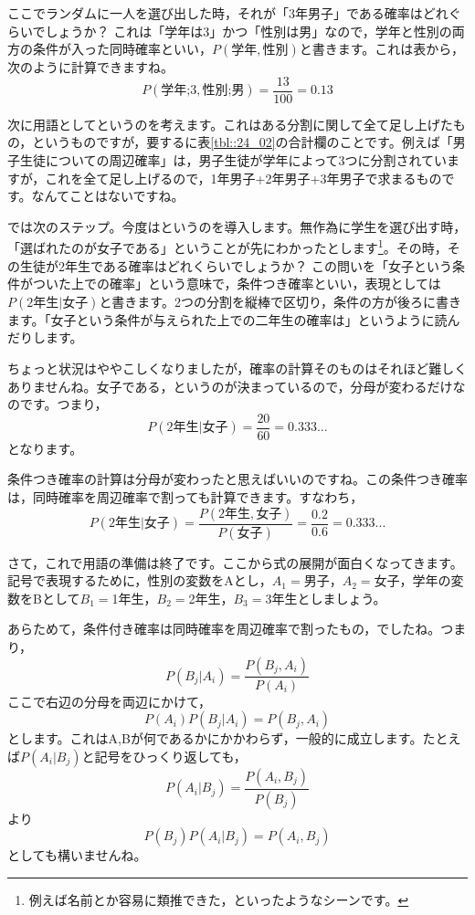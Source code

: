 ここでランダムに一人を選び出した時，それが「3年男子」である確率はどれぐらいでしょうか？ これは「学年は3」かつ「性別は男」なので，学年と性別の両方の条件が入った同時確率といい，$P(\mbox{学年},\mbox{性別})$と書きます。これは表から，次のように計算できますね。
\[ P(\mbox{学年;3},\mbox{性別;男})= \frac{13}{100}=0.13 \]

次に用語としてというのを考えます。これはある分割に関して全て足し上げたもの，というものですが，要するに表\ref{tbl::24_02}の合計欄のことです。例えば「男子生徒についての周辺確率」は，男子生徒が学年によって3つに分割されていますが，これを全て足し上げるので，1年男子+2年男子+3年男子で求まるものです。なんてことはないですね。

では次のステップ。今度はというのを導入します。無作為に学生を選び出す時，「選ばれたのが女子である」ということが先にわかったとします\footnote{例えば名前とか容易に類推できた，といったようなシーンです。}。その時，その生徒が2年生である確率はどれくらいでしょうか？ この問いを「女子という条件がついた上での確率」という意味で，条件つき確率といい，表現としては$P(\mbox{2年生}|\mbox{女子})$と書きます。2つの分割を縦棒で区切り，条件の方が後ろに書きます。「女子という条件が与えられた上での二年生の確率は」というように読んだりします。

ちょっと状況はややこしくなりましたが，確率の計算そのものはそれほど難しくありませんね。女子である，というのが決まっているので，分母が変わるだけなのです。つまり，
\[P(\mbox{2年生}|\mbox{女子})=\frac{20}{60}=0.333... \]
となります。

条件つき確率の計算は分母が変わったと思えばいいのですね。この条件つき確率は，同時確率を周辺確率で割っても計算できます。すなわち，
\[ P(\mbox{2年生}|\mbox{女子}) = \frac{P(\mbox{2年生},\mbox{女子})}{P(\mbox{女子})}=\frac{0.2}{0.6}=0.333... \]

さて，これで用語の準備は終了です。ここから式の展開が面白くなってきます。記号で表現するために，性別の変数をAとし，$A_1=$男子，$A_2=$女子，学年の変数をBとして$B_1=$1年生，$B_2=$2年生，$B_3=$3年生としましょう。

あらためて，条件付き確率は同時確率を周辺確率で割ったもの，でしたね。つまり，
\[ P(B_j | A_i) = \frac{P(B_j,A_i)}{P(A_i)} \]
ここで右辺の分母を両辺にかけて，
\[ P(A_i)P(B_j|A_i) = P(B_j,A_i) \]
とします。これはA,Bが何であるかにかかわらず，一般的に成立します。たとえば$P(A_i|B_j)$と記号をひっくり返しても，
\[ P(A_i|B_j) = \frac{P(A_i,B_j)}{P(B_j)} \]
より
\[P(B_j)P(A_i|B_j) = P(A_i,B_j) \]
としても構いませんね。



